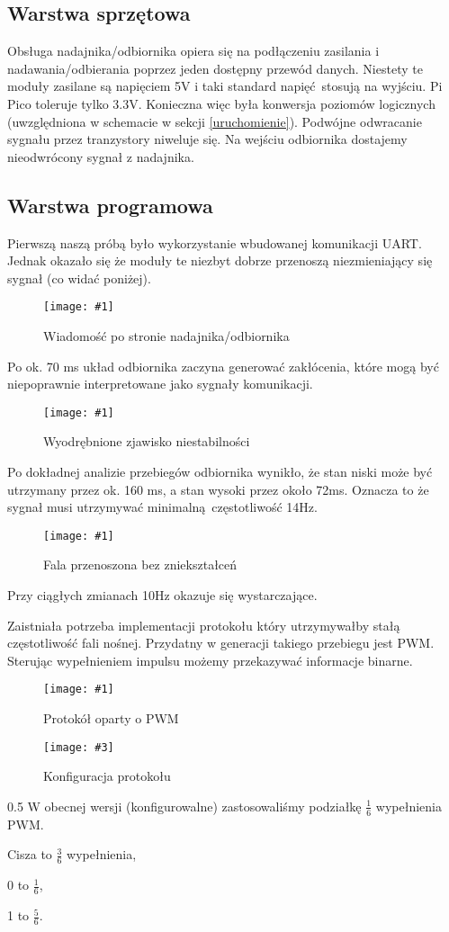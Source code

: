 \documentclass[12pt]{article}
\let\tempone\itemize
\let\temptwo\enditemize
\renewenvironment{itemize}{\tempone\setlength{\itemsep}{0cm}}{\temptwo}
\newcommand{\imgcustomsize}[3]{
	\begin{figure}[H]
		\centering
		\texttt{[image: \#1]}
		\caption{#2}
	\end{figure}
}
\newcommand{\img}[2]{\imgcustomsize{#1}{#2}{0.8}}
\newcommand{\imgsidebyside}[4]{
	\begin{figure}[H]
		\centering
		\begin{minipage}{.45\textwidth}
			\centering
			\texttt{[image: \#1]}
			\caption{#2}
		\end{minipage}%
		\hfill
		\begin{minipage}{.45\textwidth}
			\centering
			\texttt{[image: \#3]}
			\caption{#4}
		\end{minipage}
	\end{figure}
}
\begin{document}
		\subsection{Warstwa sprzętowa}
			Obsługa nadajnika/odbiornika opiera się na podłączeniu zasilania i nadawania/odbierania poprzez jeden dostępny przewód danych. Niestety te moduły zasilane są napięciem 5V i taki standard napięć stosują na wyjściu. Pi Pico toleruje tylko 3.3V. Konieczna więc była konwersja poziomów logicznych (uwzględniona w schemacie w sekcji \ref{uruchomienie}). Podwójne odwracanie sygnału przez tranzystory niweluje się. Na wejściu odbiornika dostajemy nieodwrócony sygnał z nadajnika.

		\subsection{Warstwa programowa}
			Pierwszą naszą próbą było wykorzystanie wbudowanej komunikacji UART. Jednak okazało się że moduły te niezbyt dobrze przenoszą niezmieniający się sygnał (co widać poniżej).

			\img{fail1}{Wiadomość po stronie nadajnika/odbiornika}
			Po ok. 70 ms układ odbiornika zaczyna generować zakłócenia, które mogą być niepoprawnie interpretowane jako sygnały komunikacji.

			\img{fail2}{Wyodrębnione zjawisko niestabilności}
			Po dokładnej analizie przebiegów odbiornika wynikło, że stan niski może być utrzymany przez ok. 160 ms, a stan wysoki przez około 72ms. Oznacza to że sygnał musi utrzymywać minimalną częstotliwość 14Hz.

			\img{fail3_good}{Fala przenoszona bez zniekształceń}
			Przy ciągłych zmianach 10Hz okazuje się wystarczające.

			Zaistniała potrzeba implementacji protokołu który utrzymywałby stałą częstotliwość fali nośnej. Przydatny w generacji takiego przebiegu jest PWM. Sterując wypełnieniem impulsu możemy przekazywać informacje binarne.
			\imgsidebyside{pgm/proto}{Protokół oparty o PWM}{pgm/proto_conf}{Konfiguracja protokołu}{0.5}
			W obecnej wersji (konfigurowalne) zastosowaliśmy podziałkę $\frac{1}{6}$ wypełnienia PWM.
			\begin{itemize}
				\item Cisza to  $\frac{3}{6}$ wypełnienia,
				\item 0 to  $\frac{1}{6}$,
				\item 1 to  $\frac{5}{6}$.
			\end{itemize}
\end{document}

